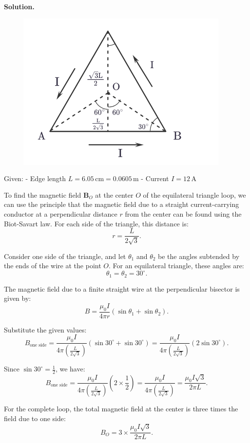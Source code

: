 \documentclass[12pt, a4paper, oneside]{report}
\newenvironment{solution}{
  \par\medskip\noindent
  \textbf{Solution.}\quad\itshape
  \par\noindent\makebox[\linewidth]{\rule{\textwidth}{0.4pt}}
}{
  \par\noindent\makebox[\linewidth]{\rule{\textwidth}{0.4pt}}
  \par\medskip
}
\begin{document}
\begin{solution}
\begin{figure}[ht!]
    \centering
    \includegraphics[width=0.5\linewidth]{11.png}
    \caption{}
    \label{fig:enter-label}
\end{figure}



Given:
- Edge length \( L = 6.05 \, \text{cm} = 0.0605 \, \text{m} \)
- Current \( I = 12 \, \text{A} \)

To find the magnetic field \(\mathbf{B}_O\) at the center \( O \) of the equilateral triangle loop, we can use the principle that the magnetic field due to a straight current-carrying conductor at a perpendicular distance \(r\) from the center can be found using the Biot-Savart law. For each side of the triangle, this distance is:
\[
r = \frac{L}{2 \sqrt{3}}.
\]


Consider one side of the triangle, and let \(\theta_1\) and \(\theta_2\) be the angles subtended by the ends of the wire at the point \( O \). For an equilateral triangle, these angles are:
\[
\theta_1 = \theta_2 = 30^\circ.
\]

The magnetic field due to a finite straight wire at the perpendicular bisector is given by:
\[
B = \frac{\mu_0 I}{4 \pi r} (\sin \theta_1 + \sin \theta_2).
\]

Substitute the given values:
\[
B_{\text{one side}} = \frac{\mu_0 I}{4 \pi \left(\frac{L}{2 \sqrt{3}}\right)} (\sin 30^\circ + \sin 30^\circ) = \frac{\mu_0 I}{4 \pi \left(\frac{L}{2 \sqrt{3}}\right)} (2 \sin 30^\circ).
\]

Since \(\sin 30^\circ = \frac{1}{2}\), we have:
\[
B_{\text{one side}} = \frac{\mu_0 I}{4 \pi \left(\frac{L}{2 \sqrt{3}}\right)} (2 \times \frac{1}{2}) = \frac{\mu_0 I}{4 \pi \left(\frac{L}{2 \sqrt{3}}\right)} = \frac{\mu_0 I \sqrt{3}}{2 \pi L}.
\]

For the complete loop, the total magnetic field at the center is three times the field due to one side:
\[
B_O = 3 \times \frac{\mu_0 I \sqrt{3}}{2 \pi L}.
\]


\end{solution}
\end{document}
